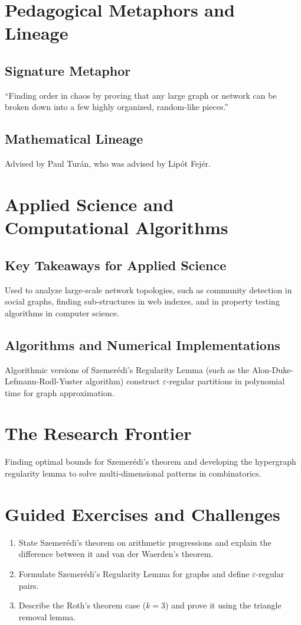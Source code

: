 \section{Pedagogical Metaphors and Lineage}
\subsection{Signature Metaphor}
``Finding order in chaos by proving that any large graph or network can be broken down into a few highly organized, random-like pieces.''

\subsection{Mathematical Lineage}
Advised by Paul Tur\'an, who was advised by Lip\'ot Fej\'er.

\section{Applied Science and Computational Algorithms}
\subsection{Key Takeaways for Applied Science}
Used to analyze large-scale network topologies, such as community detection in social graphs, finding sub-structures in web indexes, and in property testing algorithms in computer science.

\subsection{Algorithms and Numerical Implementations}
Algorithmic versions of Szemer\'edi's Regularity Lemma (such as the Alon-Duke-Lefmann-Rodl-Yuster algorithm) construct $\varepsilon$-regular partitions in polynomial time for graph approximation.

\section{The Research Frontier}
Finding optimal bounds for Szemer\'edi's theorem and developing the hypergraph regularity lemma to solve multi-dimensional patterns in combinatorics.

\section{Guided Exercises and Challenges}
\begin{enumerate}[label=\textbf{\arabic*.}]
  \item State Szemer\'edi's theorem on arithmetic progressions and explain the difference between it and van der Waerden's theorem.
  \item Formulate Szemer\'edi's Regularity Lemma for graphs and define $\varepsilon$-regular pairs.
  \item Describe the Roth's theorem case ($k=3$) and prove it using the triangle removal lemma.
\end{enumerate}

